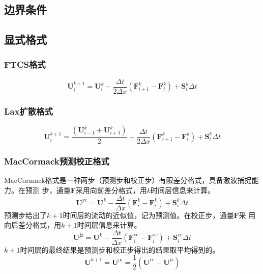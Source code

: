 \subsection{边界条件}

\subsection{显式格式}

\subsubsection{FTCS格式}
\begin{equation}
  \mathbf{U}_{i}^{k+1} 
  =
  \mathbf{U}_{i}^{k} -
  \frac{\Delta t}{2\Delta x}(\mathbf{F}_{i+1}^{k}-\mathbf{F}_{i}^{k}) + 
  \mathbf{S}_{i}^{k}\Delta t
\end{equation}

\subsubsection{Lax扩散格式}
\begin{equation}
  \mathbf{U}_{i}^{k+1} 
  =
  \frac{(\mathbf{U}_{i-1}^{k} + \mathbf{U}_{i+1}^{k})}{2} -
  \frac{\Delta t}{2\Delta x}(\mathbf{F}_{i+1}^{k}-\mathbf{F}_{i}^{k}) + 
  \mathbf{S}_{i}^{k}\Delta t
\end{equation}


\subsubsection{MacCormack预测校正格式}
MacCormack格式是一种两步（预测步和校正步）有限差分格式，具备激波捕捉能力。在预测
步，通量$\mathbf{F}$采用向前差分格式，用$k$时间层信息来计算。
\begin{equation}
  \mathbf{U}^{\mathrm{yc}} =
  \mathbf{U}^{k} -
  \frac{\Delta t }{\Delta x }
  (\mathbf{F}_{i}^{k} - \mathbf{F}_{i}^{k}) +
  \mathbf{S}_{i}^{k}\Delta t
\end{equation}
预测步给出了$k+1$时间层的流动的近似值，记为预测值。在校正步，通量$\mathbf{F}$采
用向后差分格式，用$k+1$时间层信息来计算。
\begin{equation}
  \mathbf{U}^{\mathrm{jz}} =
  \mathbf{U}^{k} -
  \frac{\Delta t }{\Delta x }
  (\mathbf{F}_{i}^{\mathrm{yc}} - \mathbf{F}_{i}^{\mathrm{yc}}) +
  \mathbf{S}_{i}^{\mathrm{yc}}\Delta t
\end{equation}
$k+1$时间层的最终结果是预测步和校正步得出的结果取平均得到的。
\begin{equation}
  \mathbf{U}^{k+1} =
  \mathbf{U}^{\mathrm{pj}} =
  \frac{1}{2}
  (\mathbf{U}^{\mathrm{yc}} +\mathbf{U}^{\mathrm{jz}})
\end{equation}

